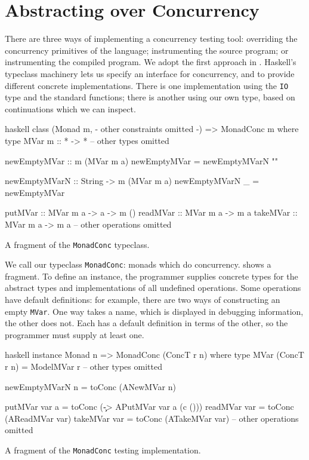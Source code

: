 \section{Abstracting over Concurrency}
\label{sec:dejafu-monadconc}

There are three ways of implementing a concurrency testing tool:
overriding the concurrency primitives of the language; instrumenting
the source program; or instrumenting the compiled program.  We adopt
the first approach in \dejafu{}.  Haskell's typeclass machinery lets
us specify an interface for concurrency, and to provide different
concrete implementations.  There is one implementation using the
\verb|IO| type and the standard functions; there is another using our
own type, based on continuations which we can inspect.

\begin{listing}
\centering
\begin{cminted}{haskell}
class (Monad m, {- other constraints omitted -}) => MonadConc m where
  type MVar m :: * -> *
  -- other types omitted

  newEmptyMVar :: m (MVar m a)
  newEmptyMVar = newEmptyMVarN ""

  newEmptyMVarN :: String -> m (MVar m a)
  newEmptyMVarN _ = newEmptyMVar

  putMVar  :: MVar m a -> a -> m ()
  readMVar :: MVar m a -> m a
  takeMVar :: MVar m a -> m a
  -- other operations omitted
\end{cminted}
\caption{A fragment of the \texttt{MonadConc} typeclass.}\label{lst:monadconc}
\end{listing}

We call our typeclass \verb|MonadConc|: monads which do concurrency.
 shows a fragment.  To define an instance, the
programmer supplies concrete types for the abstract types and
implementations of all undefined operations.  Some operations have
default definitions: for example, there are two ways of constructing
an empty \verb|MVar|.  One way takes a name, which is displayed in
debugging information, the other does not.  Each has a default
definition in terms of the other, so the programmer must supply at
least one.

\begin{listing}
\centering
\begin{cminted}{haskell}
instance Monad n => MonadConc (ConcT r n) where
  type MVar (ConcT r n) = ModelMVar r
  -- other types omitted

  newEmptyMVarN n = toConc (ANewMVar n)

  putMVar  var a = toConc (\c -> APutMVar var a (c ()))
  readMVar var   = toConc (AReadMVar var)
  takeMVar var   = toConc (ATakeMVar var)
  -- other operations omitted
\end{cminted}
\caption{A fragment of the \texttt{MonadConc} testing implementation.}\label{lst:mvarops}
\end{listing}

